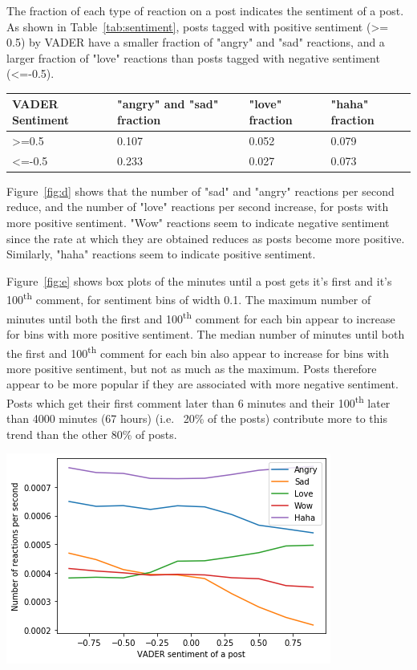 \documentclass[twoside]{article}
\begin{document}
\begin{multicols}{2}
The fraction of each type of reaction on a post indicates the sentiment of a post. As shown in Table~\ref{tab:sentiment}, posts tagged with positive sentiment (>= 0.5) by VADER  have a smaller fraction of "angry" and "sad" reactions, and a larger fraction of "love" reactions than posts tagged with negative sentiment (<=-0.5). 

\begin{center}
\label{tab:sentiment}
   \begin{tabular}{|p{1.5cm}|p{1cm}|p{1cm}|p{1cm}|}
       \hline \textbf{VADER Sentiment} & \textbf{"angry" and "sad" fraction} & \textbf{"love" fraction} & \textbf{"haha" fraction} \\
      \hline {>=0.5} & 0.107 & 0.052 & 0.079 \\
      \hline {<=-0.5} & 0.233 & 0.027 & 0.073 \\
      \hline
   \end{tabular}
\end{center}

Figure~\ref{fig:d} shows that the number of "sad" and "angry" reactions per second reduce, and the number of "love" reactions per second increase, for posts with more positive sentiment. "Wow" reactions seem to indicate negative sentiment since the rate at which they are obtained reduces as posts become more positive. Similarly, "haha" reactions seem to indicate positive sentiment. 

Figure~\ref{fig:e} shows box plots of the minutes until a post gets it's first and it's 100\textsuperscript{th} comment, for sentiment bins of width 0.1. The maximum number of minutes until both the first and 100\textsuperscript{th} comment for each bin appear to increase for bins with more positive sentiment. The median number of minutes until both the first and 100\textsuperscript{th} comment for each bin also appear to increase for bins with more positive sentiment, but not as much as the maximum. Posts therefore appear to be more popular if they are associated with more negative sentiment. Posts which get their first comment later than 6 minutes and their 100\textsuperscript{th} later than 4000 minutes (67 hours) (i.e. ~20\% of the posts) contribute more to this trend than the other 80\% of posts.
\end{multicols}
\begingroup
\centering
\includegraphics[scale=0.9]{sentiment_reactions}
\end{document}

